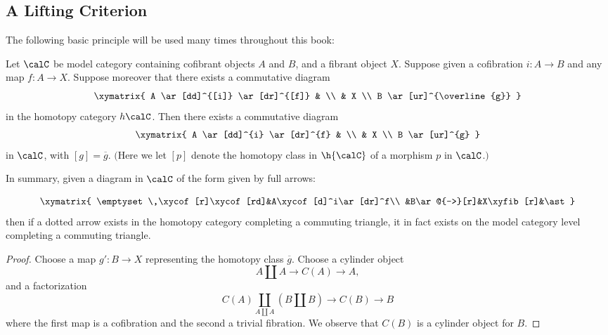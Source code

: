 \begin{Model Categories}
\begin{Already Read}
\subsection{A Lifting Criterion}

The following basic principle will be used many times throughout this book:

\begin{proposition}\label{princex}
Let $\calC$ be model category containing cofibrant objects $A$ and $B$, and a fibrant object $X$.
Suppose given a cofibration $i: A \rightarrow B$ and any map $f: A \rightarrow X$. Suppose
moreover that there exists a commutative diagram
$$ \xymatrix{ A \ar[dd]^{[i]} \ar[dr]^{[f]} & \\
& X \\
B \ar[ur]^{\overline{g}} } $$
in the homotopy category $h \calC$. Then there exists a commutative diagram
$$ \xymatrix{ A \ar[dd]^{i} \ar[dr]^{f} & \\
& X \\
B \ar[ur]^{g} } $$ in $\calC$, with $[g] = \overline{g}$. $($Here we let $[p]$ denote the homotopy class in $\h{ \calC}$ of a morphism $p$ in $\calC$.$)$ 
\end{proposition}
\begin{shaded}
In summary, given a diagram in $\calC$ of the form given by full arrows:

\[\xymatrix{
\emptyset\,\xycof[r]\xycof[rd]&A\xycof[d]^i\ar[dr]^f\\
&B\ar@{-->}[r]&X\xyfib[r]&\ast
}\]
then if a dotted arrow exists in the homotopy category completing a commuting triangle, it in fact exists on the model category level completing a commuting triangle.
\end{shaded}

\begin{proof}
Choose a map $g': B \rightarrow X$ representing the homotopy class $\overline{g}$.
Choose a cylinder object
$$A \coprod A \rightarrow C(A) \rightarrow A,$$
and a factorization
$$ C(A) \coprod_{A \coprod A} (B \coprod B) \rightarrow C(B) \rightarrow B$$
where the first map is a cofibration and the second a trivial fibration. We observe that
$C(B)$ is a cylinder object for $B$.


\end{proof}
\end{Already Read}
\end{Model Categories}

